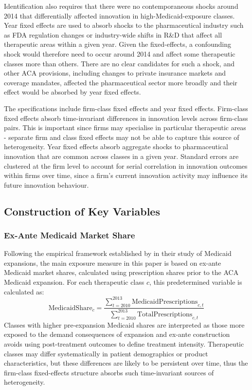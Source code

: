 \documentclass[12pt]{article}
\begin{document}
Identification also requires that there were no contemporaneous shocks around 2014 that differentially affected innovation in high-Medicaid-exposure classes. Year fixed effects are used to absorb shocks to the pharmaceutical industry such as FDA regulation changes or industry-wide shifts in R\&D that affect all therapeutic areas within a given year. Given the fixed-effects, a confounding shock would therefore need to occur around 2014 and affect some therapeutic classes more than others. There are no clear candidates for such a shock, and other ACA provisions, including changes to private insurance markets and coverage mandates, affected the pharmaceutical sector more broadly and their effect would be absorbed by year fixed effects.

The specifications include firm-class fixed effects and year fixed effects. Firm-class fixed effects absorb time-invariant differences in innovation levels across firm-class pairs. This is important since firms may specialise in particular therapeutic areas - separate firm and class fixed effects may not be able to capture this source of heterogeneity. Year fixed effects absorb aggregate shocks to pharmaceutical innovation that are common across classes in a given year. Standard errors are clustered at the firm level to account for serial correlation in innovation outcomes within firms over time, since a firm's current innovation activity may influence its future innovation behaviour.

\subsection{Construction of Key Variables}

\subsubsection{Ex-Ante Medicaid Market Share}

Following the empirical framework established by \cite{NBERw28755} in their study of Medicaid expansions, the main exposure measure in this paper is based on ex-ante Medicaid market shares, calculated using prescription shares prior to the ACA Medicaid expansion. For each therapeutic class $c$, this predetermined variable is calculated as:
\begin{equation}
\text{MedicaidShare}_{c}
=
\frac{
\sum_{t=2010}^{2013} \text{MedicaidPrescriptions}_{c,t}
}{
\sum_{t=2010}^{2013} \text{TotalPrescriptions}_{c,t}
}
\end{equation}
Classes with higher pre-expansion Medicaid shares are interpreted as those more exposed to the demand consequences of expansion and ex-ante construction avoids using post-treatment outcomes to define treatment intensity. Therapeutic classes may differ systematically in patient demographics or product characteristics, but these differences are likely to be persistent over time, thus the firm-class fixed-effects structure absorbs such time-invariant sources of heterogeneity.
\end{document}
